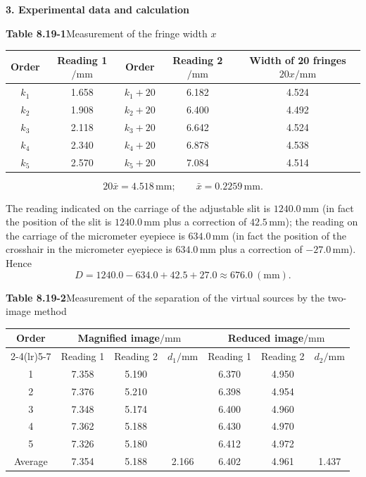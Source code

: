 \textbf{3. Experimental data and calculation}

\begin{center}
\textbf{Table 8.19-1}\quad Measurement of the fringe width $x$\\[3pt]
\begin{tabular}{ccccc}
\toprule
Order & Reading 1$/\mathrm{mm}$ & Order & Reading 2$/\mathrm{mm}$ & Width of 20 fringes $20x/\mathrm{mm}$ \\
\midrule
$k_1$ & 1.658 & $k_1+20$ & 6.182 & 4.524 \\
$k_2$ & 1.908 & $k_2+20$ & 6.400 & 4.492 \\
$k_3$ & 2.118 & $k_3+20$ & 6.642 & 4.524 \\
$k_4$ & 2.340 & $k_4+20$ & 6.878 & 4.538 \\
$k_5$ & 2.570 & $k_5+20$ & 7.084 & 4.514 \\
\bottomrule
\end{tabular}
\end{center}

\[
20\bar{x}=4.518\,\mathrm{mm};\qquad \bar{x}=0.2259\,\mathrm{mm}.
\]

The reading indicated on the carriage of the adjustable slit is $1240.0\,\mathrm{mm}$ (in fact the position of the slit is $1240.0\,\mathrm{mm}$ plus a correction of $42.5\,\mathrm{mm}$); the reading on the carriage of the micrometer eyepiece is $634.0\,\mathrm{mm}$ (in fact the position of the crosshair in the micrometer eyepiece is $634.0\,\mathrm{mm}$ plus a correction of $-27.0\,\mathrm{mm}$). Hence
\[
D=1240.0-634.0+42.5+27.0\approx676.0\ (\mathrm{mm}).
\]

\begin{center}
\textbf{Table 8.19-2}\quad Measurement of the separation of the virtual sources by the two-image method\\[3pt]
\begin{tabular}{ccccccc}
\toprule
Order & \multicolumn{3}{c}{Magnified image$/\mathrm{mm}$} & \multicolumn{3}{c}{Reduced image$/\mathrm{mm}$} \\
\cmidrule(lr){2-4}\cmidrule(lr){5-7}
 & Reading 1 & Reading 2 & $d_1/\mathrm{mm}$ & Reading 1 & Reading 2 & $d_2/\mathrm{mm}$ \\
\midrule
1 & 7.358 & 5.190 & & 6.370 & 4.950 & \\
2 & 7.376 & 5.210 & & 6.398 & 4.954 & \\
3 & 7.348 & 5.174 & & 6.400 & 4.960 & \\
4 & 7.362 & 5.188 & & 6.430 & 4.970 & \\
5 & 7.326 & 5.180 & & 6.412 & 4.972 & \\
\midrule
Average & 7.354 & 5.188 & 2.166 & 6.402 & 4.961 & 1.437 \\
\bottomrule
\end{tabular}
\end{center}

